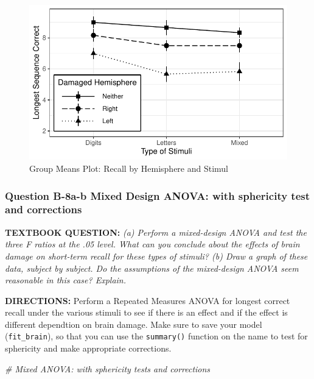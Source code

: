 \documentclass[
]{article}
\newenvironment{Shaded}{\begin{snugshade}}{\end{snugshade}}
\newcommand{\CommentTok}[1]{\textcolor[rgb]{0.56,0.35,0.01}{\textit{#1}}}
\begin{document}
\begin{figure}

{\centering \includegraphics{Chapter-16-Assignment-R-Skeleton--2020spring-_files/figure-latex/unnamed-chunk-24-1} 

}

\caption{Group Means Plot: Recall by Hemisphere and Stimul}\label{fig:unnamed-chunk-24}
\end{figure}

\clearpage

\hypertarget{question-b-8a-b-mixed-design-anova-with-sphericity-test-and-corrections}{%
\subsubsection{Question B-8a-b Mixed Design ANOVA: with sphericity test
and
corrections}\label{question-b-8a-b-mixed-design-anova-with-sphericity-test-and-corrections}}

\textbf{TEXTBOOK QUESTION:} \emph{(a) Perform a mixed-design ANOVA and
test the three F ratios at the .05 level. What can you conclude about
the effects of brain damage on short-term recall for these types of
stimuli? (b) Draw a graph of these data, subject by subject. Do the
assumptions of the mixed-design ANOVA seem reasonable in this case?
Explain. }

\textbf{DIRECTIONS:} Perform a Repeated Measures ANOVA for longest
correct recall under the various stimuli to see if there is an effect
and if the effect is different dependtion on brain damage. Make sure to
save your model (\texttt{fit\_brain}), so that you can use the
\texttt{summary()} function on the name to test for sphericity and make
appropriate corrections.

\begin{Shaded}
\begin{Highlighting}[]
\CommentTok{\# Mixed ANOVA:  with sphericity tests and corrections}
\end{Highlighting}
\end{Shaded}
\end{document}
